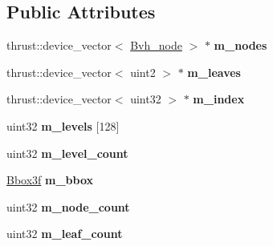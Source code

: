\subsection*{\-Public \-Attributes}
\begin{DoxyCompactItemize}
\item 
\hypertarget{structnih_1_1cuda_1_1_sah__builder_a1172b22c18e8acefdfefe35dc300c204}{
thrust\-::device\-\_\-vector$<$ \hyperlink{structnih_1_1_bvh__node}{\-Bvh\-\_\-node} $>$ $\ast$ {\bfseries m\-\_\-nodes}}
\label{structnih_1_1cuda_1_1_sah__builder_a1172b22c18e8acefdfefe35dc300c204}

\item 
\hypertarget{structnih_1_1cuda_1_1_sah__builder_a891274cfa4bd165b0d5e673202d0d296}{
thrust\-::device\-\_\-vector$<$ uint2 $>$ $\ast$ {\bfseries m\-\_\-leaves}}
\label{structnih_1_1cuda_1_1_sah__builder_a891274cfa4bd165b0d5e673202d0d296}

\item 
\hypertarget{structnih_1_1cuda_1_1_sah__builder_afe76284ecb556bc01ad05d123bf391b1}{
thrust\-::device\-\_\-vector$<$ uint32 $>$ $\ast$ {\bfseries m\-\_\-index}}
\label{structnih_1_1cuda_1_1_sah__builder_afe76284ecb556bc01ad05d123bf391b1}

\item 
\hypertarget{structnih_1_1cuda_1_1_sah__builder_af02a5191db284a1586f8ab77c6351637}{
uint32 {\bfseries m\-\_\-levels} \mbox{[}128\mbox{]}}
\label{structnih_1_1cuda_1_1_sah__builder_af02a5191db284a1586f8ab77c6351637}

\item 
\hypertarget{structnih_1_1cuda_1_1_sah__builder_a17aa7441bff68ee32e86d0efdb1058eb}{
uint32 {\bfseries m\-\_\-level\-\_\-count}}
\label{structnih_1_1cuda_1_1_sah__builder_a17aa7441bff68ee32e86d0efdb1058eb}

\item 
\hypertarget{structnih_1_1cuda_1_1_sah__builder_ab9045c8343d14d1da97701c1327d1875}{
\hyperlink{structnih_1_1_bbox}{\-Bbox3f} {\bfseries m\-\_\-bbox}}
\label{structnih_1_1cuda_1_1_sah__builder_ab9045c8343d14d1da97701c1327d1875}

\item 
\hypertarget{structnih_1_1cuda_1_1_sah__builder_a2c8d0b95c3ac84f0504d81b7fa405886}{
uint32 {\bfseries m\-\_\-node\-\_\-count}}
\label{structnih_1_1cuda_1_1_sah__builder_a2c8d0b95c3ac84f0504d81b7fa405886}

\item 
\hypertarget{structnih_1_1cuda_1_1_sah__builder_a05f6533b879e14ef23b786924b41158a}{
uint32 {\bfseries m\-\_\-leaf\-\_\-count}}
\label{structnih_1_1cuda_1_1_sah__builder_a05f6533b879e14ef23b786924b41158a}


\end{DoxyCompactItemize}
